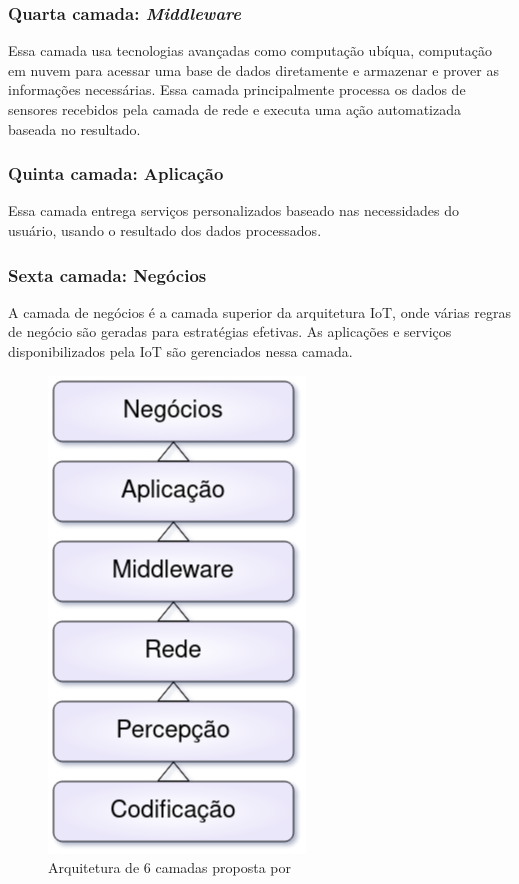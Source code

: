 \documentclass[tcc,capa]{texufpel}
\begin{document}
\subsubsection{Quarta camada: \textit{Middleware}}
    Essa camada usa tecnologias avançadas como computação ubíqua, computação em nuvem para acessar uma base de dados diretamente e armazenar e prover as informações necessárias. Essa camada principalmente processa os dados de sensores recebidos pela camada de rede e executa uma ação automatizada baseada no resultado.

\subsubsection{Quinta camada: Aplicação}
    Essa camada entrega serviços personalizados baseado nas necessidades do usuário, usando o resultado dos dados processados.

\subsubsection{Sexta camada: Negócios}
    A camada de negócios é a camada superior da arquitetura IoT, onde várias regras de negócio são geradas para estratégias efetivas. As aplicações e serviços disponibilizados pela IoT são gerenciados nessa camada.

\begin{figure}[h]
    \centering
    \includegraphics[scale=0.5]{figs/xu.png}
    \caption{Arquitetura de 6 camadas proposta por \citet{xu}}
    \label{fig:6layer}
\end{figure}
\end{document}
